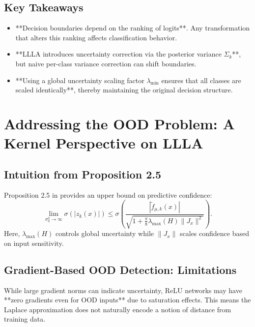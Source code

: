 \documentclass{article}
\begin{document}
\subsection{Key Takeaways}
\begin{itemize}
    \item **Decision boundaries depend on the ranking of logits**. Any transformation that alters this ranking affects classification behavior.
    \item **LLLA introduces uncertainty correction via the posterior variance \( \Sigma_k \)**, but naive per-class variance correction can shift boundaries.
    \item **Using a global uncertainty scaling factor \( \lambda_{\min} \) ensures that all classes are scaled identically**, thereby maintaining the original decision structure.
\end{itemize}


\section{Addressing the OOD Problem: A Kernel Perspective on LLLA}

\subsection{Intuition from Proposition 2.5}
Proposition 2.5 in \citep{immer2021improving} provides an upper bound on predictive confidence:
\begin{equation}
\lim_{\sigma_0^2 \to \infty} \sigma(|z_k(x)|) \leq \sigma\left( \frac{|\tilde{f}_{\mu,k}(x)|}{\sqrt{1+\frac{\pi}{8} \lambda_{\max}(H) \|J_x\|^2}} \right).
\end{equation}
Here, \( \lambda_{\max}(H) \) controls global uncertainty while \( \|J_x\| \) scales confidence based on input sensitivity.

\subsection{Gradient-Based OOD Detection: Limitations}
While large gradient norms can indicate uncertainty, ReLU networks may have **zero gradients even for OOD inputs** due to saturation effects. This means the Laplace approximation does not naturally encode a notion of distance from training data.
\end{document}
